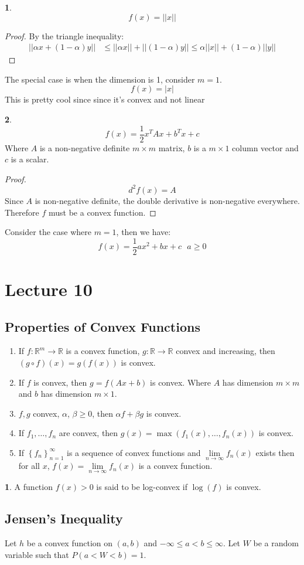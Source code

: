 \documentclass[english,12pt]{article}
\theoremstyle{plain}
\theoremstyle{definition}
\newtheorem*{definition}{\protect\definitionname}
\newtheorem*{example}{\protect\examplename}
\theoremstyle{definition} %
\newcommand{\defn}[1]{\begin{definition} #1 \end{definition} }
\newcommand{\eg}[1]{\begin{example} #1 \end{example} }
\newcommand{\prf}[1]{\begin{proof} #1 \end{proof} }
\providecommand{\definitionname}{Definition}
\providecommand{\examplename}{Example}
\newcommand{\enuma}[1]{\begin{enumerate}[label=(\alph{*})] #1 \end{enumerate}}
\newcommand{\curlybrac}[1]{\left\{#1\right\}} %
\newcommand{\R}{\mathbb{R}} %
\begin{document}
\eg{
\[f(x)=||x||\]
\prf{
By the triangle inequality:
\begin{align*}
||\alpha x+(1-\alpha)y||&\le ||\alpha x||+||(1-\alpha)y||
\le \alpha||x||+(1-\alpha)||y||
\end{align*}

}
The special case is when the dimension is 1, consider $m=1$.
\[f(x)=|x|\]
This is pretty cool since since it's convex and not linear
}

\eg{
\[f(x)=\frac{1}{2}x^TAx+b^Tx+c\]
Where $A$ is a non-negative definite $m\times m$ matrix, $b$ is a $m\times 1$ column vector and $c$ is a scalar.

\prf{
\[d^2f(x)=A\]
Since $A$ is non-negative definite, the double derivative is non-negative everywhere.  Therefore $f$ must be a convex function.
}

Consider the case where $m=1$, then we have:
\[f(x)=\frac{1}{2}ax^2+bx+c\text{ }a\ge 0\]

}
\section*{Lecture 10}
\subsection{Properties of Convex Functions}
\enuma{
\item If $f:\R^m\to\R$ is a convex function, $g:\R\to\R$ convex and increasing, then $(g\circ f)(x)=g(f(x))$ is convex.

\item If $f$ is convex, then $g=f(Ax+b)$ is convex.  Where $A$ has dimension $m\times m$ and $b$ has dimension $m\times 1$.

\item $f,g$ convex, $\alpha$, $\beta\ge 0$, then $\alpha f+\beta g$ is convex.
\item If $f_1,\ldots, f_n$ are convex, then $g(x)=\max(f_1(x),\ldots,f_n(x))$ is convex.
\item If $\curlybrac{f_n}_{n=1}^\infty$ is a sequence of convex functions and $\lim\limits_{n\to\infty}f_n(x)$ exists then for all $x$, $f(x)=\lim\limits_{n\to\infty}f_n(x)$ is a convex function.
}

\defn{
A function $f(x)>0$ is said to be log-convex if $\log(f)$ is convex.
}

\subsection{Jensen's Inequality}
Let $h$ be a convex function on $(a,b)$ and $-\infty\le a<b\le\infty$.  Let $W$ be a random variable such that $P(a<W<b)=1$.
\end{document}
